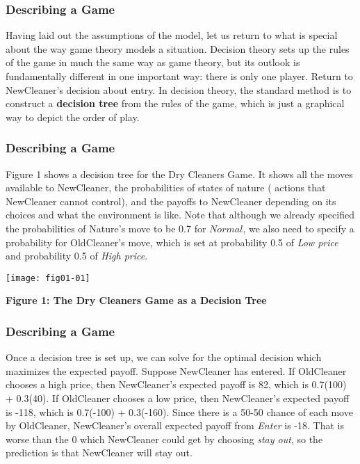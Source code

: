  \begin{frame}[fragile]\frametitle{Describing a Game}
  Having laid out the assumptions of the model, let us return to  what is
special about the way game theory models a situation. Decision theory  sets up
the rules of the game in  much the same way as game theory, but its outlook is
fundamentally different in one important way: there is only one player.   Return
to NewCleaner's decision about entry.   In decision theory,    the  standard
method is to  construct a {\bf decision tree} from the rules of the game, which
is just a graphical way to depict the order of play.

\end{frame}

 \begin{frame}[fragile]\frametitle{Describing a Game}
Figure 1 shows a decision tree for  the Dry Cleaners Game.   It shows all the
moves available to NewCleaner,  the probabilities of states of nature ( actions
that NewCleaner cannot control),  and the payoffs  to NewCleaner depending on
its choices and what the environment is like. Note that although we already
specified the probabilities of Nature's move to be 0.7 for $Normal$, we also
need to specify a probability for OldCleaner's move, which is set at probability
0.5 of {\it Low price} and probability 0.5 of {\it High price}.



 \texttt{[image: fig01-01]}



\begin{center} {\bf Figure 1:   The Dry Cleaners Game as a Decision Tree   }
\end{center}
\end{frame}

 \begin{frame}[fragile]\frametitle{Describing a Game}
Once a decision tree is set up, we can solve for the optimal decision which
maximizes the expected payoff.   Suppose NewCleaner has entered.  If  OldCleaner
chooses a high price, then  NewCleaner's expected payoff is 82, which is
0.7(100) + 0.3(40).  If  OldCleaner chooses a  low  price, then  NewCleaner's
expected payoff is  -118, which is 0.7(-100) + 0.3(-160). Since there is a 50-50
chance of each move by OldCleaner, NewCleaner's overall expected payoff from
{\it Enter} is  -18. That is worse than the 0 which NewCleaner could get by
choosing {\it stay out}, so the prediction is that NewCleaner will stay out.


\end{frame}

